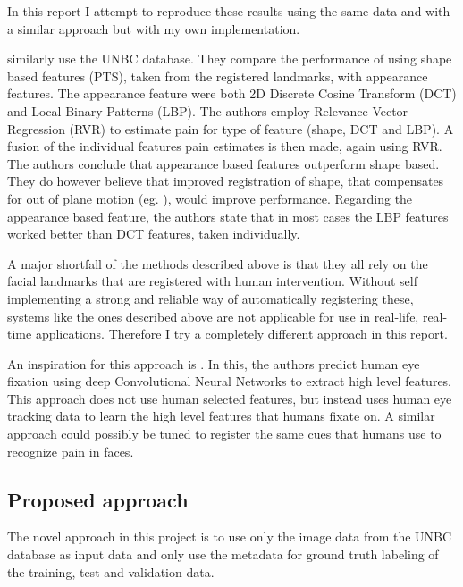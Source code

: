 \documentclass[Main]{subfiles}
\begin{document}
		In this report I attempt to reproduce these results using the same data and with a similar approach but with my own implementation.


		\citet{Kaltwang2012} similarly use the UNBC database.
		They compare the performance of using shape based features (PTS), taken from the registered landmarks, with appearance features.
		The appearance feature were both 2D Discrete Cosine Transform (DCT) and Local Binary Patterns (LBP).
		The authors employ Relevance Vector Regression (RVR) to estimate pain for type of feature (shape, DCT and LBP).
		A fusion of the individual features pain estimates is then made, again using RVR.
		The authors conclude that appearance based features outperform shape based.
		They do however believe that improved registration of shape, that compensates for out of plane motion (eg. \cite{Rudovic2011}), would improve performance.
		Regarding the appearance based feature, the authors state that in most cases the LBP features worked better than DCT features, taken individually.

		A major shortfall of the methods described above is that they all  rely on the facial landmarks that are registered with human intervention.
		Without self implementing a strong and reliable way of automatically registering these, systems like the ones described above are not applicable for use in real-life, real-time applications.
		Therefore I try a completely different approach in this report.

		An inspiration for this approach is \cite{Shen2012a}.
		In this, the authors predict human eye fixation using deep Convolutional Neural Networks to extract high level features. 
		This approach does not use human selected features, but instead uses human eye tracking data to learn the high level features that humans fixate on.
		A similar approach could possibly be tuned to register the same cues that humans use to recognize pain in faces.


	\subsection{Proposed approach} %
		\label{sub:proposed_approach}
		The novel approach in this project is to use only the image data from the UNBC database as input data and only use the metadata for ground truth labeling of the training, test and validation data.
\end{document}
